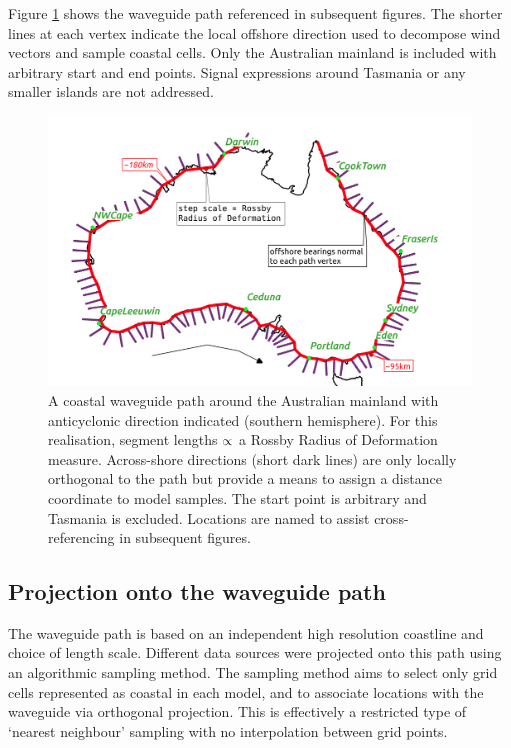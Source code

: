 Figure \ref{fig:CTW_path} shows the waveguide path referenced in subsequent figures.
The shorter lines at each vertex indicate the local offshore direction used to decompose wind vectors and sample coastal cells.
Only the Australian mainland is included with arbitrary start and end points.
Signal expressions around Tasmania or any smaller islands are not addressed. 
\begin{figure}[H]\centering
    \noindent\includegraphics[width=\figwidthHalf]{figures/maps/map_overview.png}
    \caption[Coastal waveguide path around the Australian mainland used for this study.]
            {A coastal waveguide path around the Australian mainland with anticyclonic direction indicated (southern hemisphere).
             For this realisation, segment lengths $\protect\propto$ a Rossby Radius of Deformation measure. 
             Across-shore directions (short dark lines) are only locally orthogonal to the path but provide a means to assign a distance coordinate to model samples. 
             The start point is arbitrary and Tasmania is excluded.
             Locations are named to assist cross-referencing in subsequent figures.}
    \label{fig:CTW_path}
\end{figure}  

\subsection{Projection onto the waveguide path}

The waveguide path is based on an independent high resolution coastline and choice of length scale.
Different data sources were projected onto this path using an algorithmic sampling method.
The sampling method aims to select only grid cells represented as coastal in each model, and to associate locations with the waveguide via orthogonal projection. 
This is effectively a restricted type of `nearest neighbour' sampling with no interpolation between grid points.

